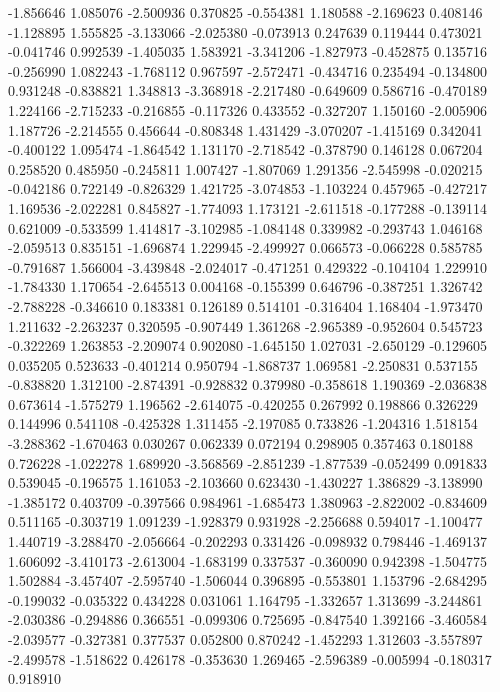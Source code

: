 -1.856646
1.085076
-2.500936
0.370825
-0.554381
1.180588
-2.169623
0.408146
-1.128895
1.555825
-3.133066
-2.025380
-0.073913
0.247639
0.119444
0.473021
-0.041746
0.992539
-1.405035
1.583921
-3.341206
-1.827973
-0.452875
0.135716
-0.256990
1.082243
-1.768112
0.967597
-2.572471
-0.434716
0.235494
-0.134800
0.931248
-0.838821
1.348813
-3.368918
-2.217480
-0.649609
0.586716
-0.470189
1.224166
-2.715233
-0.216855
-0.117326
0.433552
-0.327207
1.150160
-2.005906
1.187726
-2.214555
0.456644
-0.808348
1.431429
-3.070207
-1.415169
0.342041
-0.400122
1.095474
-1.864542
1.131170
-2.718542
-0.378790
0.146128
0.067204
0.258520
0.485950
-0.245811
1.007427
-1.807069
1.291356
-2.545998
-0.020215
-0.042186
0.722149
-0.826329
1.421725
-3.074853
-1.103224
0.457965
-0.427217
1.169536
-2.022281
0.845827
-1.774093
1.173121
-2.611518
-0.177288
-0.139114
0.621009
-0.533599
1.414817
-3.102985
-1.084148
0.339982
-0.293743
1.046168
-2.059513
0.835151
-1.696874
1.229945
-2.499927
0.066573
-0.066228
0.585785
-0.791687
1.566004
-3.439848
-2.024017
-0.471251
0.429322
-0.104104
1.229910
-1.784330
1.170654
-2.645513
0.004168
-0.155399
0.646796
-0.387251
1.326742
-2.788228
-0.346610
0.183381
0.126189
0.514101
-0.316404
1.168404
-1.973470
1.211632
-2.263237
0.320595
-0.907449
1.361268
-2.965389
-0.952604
0.545723
-0.322269
1.263853
-2.209074
0.902080
-1.645150
1.027031
-2.650129
-0.129605
0.035205
0.523633
-0.401214
0.950794
-1.868737
1.069581
-2.250831
0.537155
-0.838820
1.312100
-2.874391
-0.928832
0.379980
-0.358618
1.190369
-2.036838
0.673614
-1.575279
1.196562
-2.614075
-0.420255
0.267992
0.198866
0.326229
0.144996
0.541108
-0.425328
1.311455
-2.197085
0.733826
-1.204316
1.518154
-3.288362
-1.670463
0.030267
0.062339
0.072194
0.298905
0.357463
0.180188
0.726228
-1.022278
1.689920
-3.568569
-2.851239
-1.877539
-0.052499
0.091833
0.539045
-0.196575
1.161053
-2.103660
0.623430
-1.430227
1.386829
-3.138990
-1.385172
0.403709
-0.397566
0.984961
-1.685473
1.380963
-2.822002
-0.834609
0.511165
-0.303719
1.091239
-1.928379
0.931928
-2.256688
0.594017
-1.100477
1.440719
-3.288470
-2.056664
-0.202293
0.331426
-0.098932
0.798446
-1.469137
1.606092
-3.410173
-2.613004
-1.683199
0.337537
-0.360090
0.942398
-1.504775
1.502884
-3.457407
-2.595740
-1.506044
0.396895
-0.553801
1.153796
-2.684295
-0.199032
-0.035322
0.434228
0.031061
1.164795
-1.332657
1.313699
-3.244861
-2.030386
-0.294886
0.366551
-0.099306
0.725695
-0.847540
1.392166
-3.460584
-2.039577
-0.327381
0.377537
0.052800
0.870242
-1.452293
1.312603
-3.557897
-2.499578
-1.518622
0.426178
-0.353630
1.269465
-2.596389
-0.005994
-0.180317
0.918910

